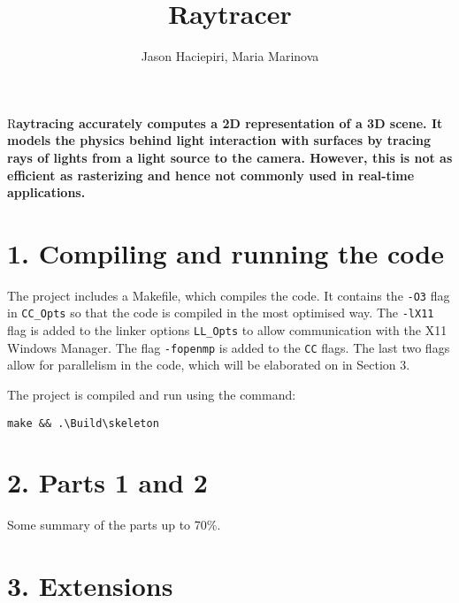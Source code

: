 \documentclass[DIV=calc, paper=a4, fontsize=11pt, twocolumn]{article}	 %
\title{Raytracer} %
\author{Jason Haciepiri, Maria Marinova} %
\date{\vspace{-30pt}} %
\newcommand{\initial}[1]{ %
	\lettrine[lines=3,lhang=0.3,nindent=0em]{
		\color{Goldenrod}
		{\textsf{#1}}}{}}
\begin{document}
	
	\maketitle %
	
	\thispagestyle{fancy} %
	
	
	\initial{R}\textbf{aytracing accurately computes a 2D representation of a 3D scene. It models the physics behind light interaction with surfaces by tracing rays of lights from a light source to the camera. However, this is not as efficient as rasterizing and hence not commonly used in real-time applications.}
	
	
	\section*{1. Compiling and running the code}

	The project includes a Makefile, which compiles the code. It contains the \texttt{-O3} flag in \texttt{CC\_Opts} so that the code is compiled in the most optimised way. The \texttt{-lX11} flag is added to the linker options \texttt{LL\_Opts} to allow communication with the X11 Windows Manager. The flag \texttt{-fopenmp} is added to the \texttt{CC} flags. The last two flags allow for parallelism in the code, which will be elaborated on in Section 3. 
	\par
	The project is compiled and run using the command: \par
	\texttt{make \&\&  .\textbackslash Build\textbackslash skeleton} 

	\section*{2. Parts 1 and 2}
	Some summary of the parts up to 70\%. 
		
	\section*{3. Extensions}
\end{document}
